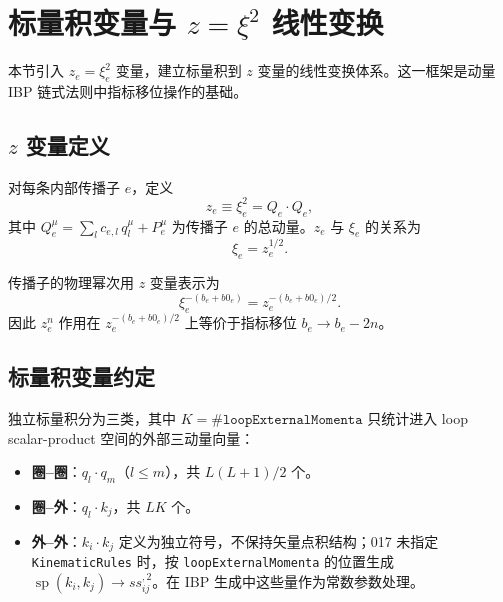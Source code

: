﻿\documentclass[a4paper,11pt]{article}
\begin{document}
\section{标量积变量与 $z=\xi^2$ 线性变换}

本节引入 $z_e = \xi_e^2$ 变量，建立标量积到 $z$ 变量的线性变换体系。这一框架是动量 IBP 链式法则中指标移位操作的基础。

\subsection{$z$ 变量定义}

对每条内部传播子 $e$，定义
\begin{equation}
  z_e \equiv \xi_e^2 = Q_e \cdot Q_e,
  \label{zDef}
\end{equation}
其中 $Q_e^\mu = \sum_l c_{e,l}\, q_l^\mu + P_e^\mu$ 为传播子 $e$ 的总动量。$z_e$ 与 $\xi_e$ 的关系为
\begin{equation}
  \xi_e = z_e^{1/2}.
  \label{xiFromZ}
\end{equation}

传播子的物理幂次用 $z$ 变量表示为
\begin{equation}
  \xi_e^{-(b_e + b0_e)} = z_e^{-(b_e + b0_e)/2}.
  \label{zPower}
\end{equation}
因此 $z_e^n$ 作用在 $z_e^{-(b_e+b0_e)/2}$ 上等价于指标移位 $b_e \to b_e - 2n$。

\subsection{标量积变量约定}

独立标量积分为三类，其中 $K=\#\texttt{loopExternalMomenta}$ 只统计进入 loop scalar-product 空间的外部三动量向量：

\begin{itemize}
  \item \textbf{圈--圈}：$q_l \cdot q_m$（$l \leq m$），共 $L(L+1)/2$ 个。
  \item \textbf{圈--外}：$q_l \cdot k_j$，共 $LK$ 个。
  \item \textbf{外--外}：$k_i \cdot k_j$ 定义为独立符号，不保持矢量点积结构；017 未指定 \texttt{KinematicRules} 时，按 \texttt{loopExternalMomenta} 的位置生成 $\operatorname{sp}(k_i,k_j)\to ss_{ij}^{,2}$。在 IBP 生成中这些量作为常数参数处理。
\end{itemize}
\end{document}
